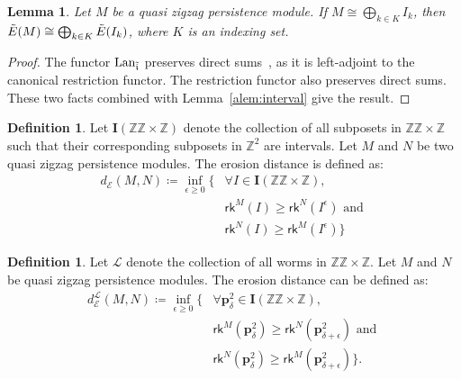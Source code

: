 \documentclass{article}
\newcommand{\qzzmod}{quasi zigzag persistence module}
\newcommand{\RKG}{\mathsf{rk}}
\newcommand{\vp}{\mathbf{p}}
\newcommand{\zz}{\mathbb{ZZ}}
\newcommand{\z}{\mathbb{Z}}
\theoremstyle{plain}
\newtheorem{lemma}[theorem]{Lemma}
\theoremstyle{definition}
\newtheorem{definition}[theorem]{Definition}
\theoremstyle{remark}
\begin{document}
\begin{lemma}\label{alem:decomposition}
    Let $M$ be a \qzzmod. If $M \cong \bigoplus_{k\in K} I_k$, then $\Tilde{E}(M) \cong \bigoplus_{k \in K} \Tilde{E}(I_k)$, where $K$ is an indexing set.
\end{lemma}

\begin{proof}
    The functor $\text{Lan}_{\Tilde{\mathfrak{i}}}$ preserves direct sums~\cite{Saunders_Maclane_Cat_Theory}, as it is left-adjoint to the canonical restriction functor. The restriction functor also preserves direct sums. These two facts combined with Lemma~\ref{alem:interval} give the result.
\end{proof}

\begin{definition}
\label{adef:erosion_dist}
    Let \textbf{I}$(\zz \times \z)$ denote the collection of all subposets in $\zz \times \z$ such that their corresponding subposets in $\z^2$ are intervals. Let $M$ and $N$ be two \qzzmod s. The erosion distance is defined as:
    \begin{equation*}
    \begin{split}
        d_\mathcal{E}(M,N) \coloneqq \inf \limits_{\epsilon \geq 0} 
        \{ & \forall I \in \textbf{I}(\zz \times \z), \\
        & \RKG^M(I) \geq \RKG^N(I^\epsilon) \text{ and } \\
        & \RKG^N(I) \geq \RKG^M(I^\epsilon)  \}
    \end{split}
    \end{equation*}
\end{definition}

\begin{definition}
    Let $\mathcal{L}$ denote the collection of all worms in $\zz \times \z$. Let $M$ and $N$ be \qzzmod s. The erosion distance can be defined as:
    \begin{equation*}
    \begin{split}
        d_\mathcal{E}^\mathcal{L}(M,N) \coloneqq \inf \limits_{\epsilon \geq 0} 
        \{ & \forall \boxed{\vp}^2_\delta \in \textbf{I}(\zz \times \z), \\
        & \RKG^M\left (\boxed{\vp}^2_\delta\right) \geq \RKG^N\left(\boxed{\vp}^2_{\delta+\epsilon}\right ) \text{ and } \\
        & \RKG^N\left (\boxed{\vp}^2_\delta\right ) \geq \RKG^M\left (\boxed{\vp}^2_{\delta+\epsilon}\right)  \}.
    \end{split}
    \end{equation*}
\end{definition}
\end{document}
